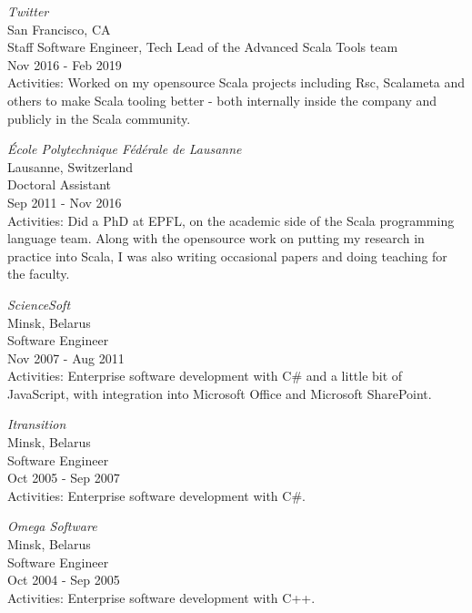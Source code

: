 \documentclass[margin, 10pt]{Stylesheet}
\begin{document}
\begin{resume}
\emph{Twitter}\\
San Francisco, CA \\
Staff Software Engineer, Tech Lead of the Advanced Scala Tools team \\
Nov 2016 - Feb 2019 \\
Activities: Worked on my opensource Scala projects including Rsc, Scalameta and others to make
Scala tooling better - both internally inside the company and publicly in the Scala community.

\emph{\'{E}cole Polytechnique F\'{e}d\'{e}rale de Lausanne} \\
Lausanne, Switzerland \\
Doctoral Assistant \\
Sep 2011 - Nov 2016 \\
Activities: Did a PhD at EPFL, on the academic side of the Scala programming language team.
Along with the opensource work on putting my research in practice into Scala, I was also writing
occasional papers and doing teaching for the faculty.

\emph{ScienceSoft} \\
Minsk, Belarus \\
Software Engineer \\
Nov 2007 - Aug 2011 \\
Activities: Enterprise software development with C\# and a little bit of JavaScript,
with integration into Microsoft Office and Microsoft SharePoint.

\emph{Itransition} \\
Minsk, Belarus \\
Software Engineer \\
Oct 2005 - Sep 2007 \\
Activities: Enterprise software development with C\#.

\emph{Omega Software} \\
Minsk, Belarus \\
Software Engineer \\
Oct 2004 - Sep 2005 \\
Activities: Enterprise software development with C++.


\end{resume}
\end{document}
